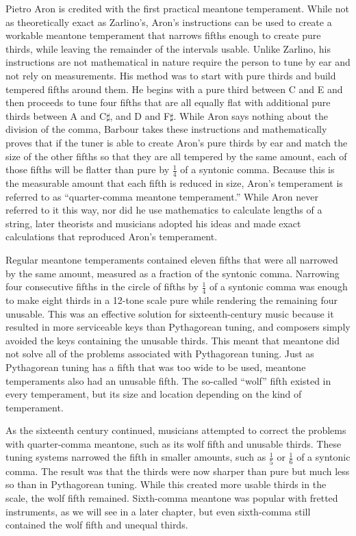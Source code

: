 Pietro Aron is credited with the first practical meantone temperament.  While not as theoretically
exact as Zarlino's, Aron's instructions can be used to create a workable meantone temperament that
narrows fifths enough to create pure thirds, while leaving the remainder of the intervals usable.
Unlike Zarlino, his instructions are not mathematical in nature require the person to tune by ear
and not rely on measurements.  His method was to start with pure thirds and build tempered fifths
around them.  He begins with a pure third between C and E and then proceeds to tune four fifths that
are all equally flat with additional pure thirds between A and C$\sharp$, and D and F$\sharp$.
While Aron says nothing about the division of the comma, Barbour takes these instructions and
mathematically proves that if the tuner is able to create Aron's pure thirds by ear and match the
size of the other fifths so that they are all tempered by the same amount, each of those fifths will
be flatter than pure by $ \frac{1}{4} $ of a syntonic comma.\autocite[27]{MB:1}  Because this is the
measurable amount that each fifth is reduced in size, Aron's temperament is referred to as
``quarter-comma meantone temperament.'' While Aron never referred to it this way, nor did he use
mathematics to calculate lengths of a string, later theorists and musicians adopted his ideas and made
exact calculations that reproduced Aron's temperament.

Regular meantone temperaments contained eleven fifths that were all narrowed by the same
amount, measured as a fraction of the syntonic comma. Narrowing
four consecutive fifths in the circle of fifths by $ \frac{1}{4} $ of a syntonic comma was
enough to make eight thirds in a 12-tone scale pure while rendering the remaining four
unusable.\autocite[33]{RD:1}  This was an effective solution for
sixteenth-century music because it resulted in more serviceable keys than Pythagorean
tuning, and composers simply avoided the keys containing the unusable thirds.
This meant that meantone did not solve all of the problems associated with
Pythagorean tuning.  Just as Pythagorean tuning has a fifth that was too wide to be used,
meantone temperaments also had an unusable fifth.  The so-called ``wolf'' fifth existed in
every temperament, but its size and location depending on the kind of temperament.

As the sixteenth century continued, musicians attempted to correct the problems with
quarter-comma meantone, such as its wolf fifth and unusable thirds.
These tuning systems narrowed the fifth in smaller amounts, such as $
\frac{1}{5} $ or $ \frac{1}{6} $ of a syntonic comma. The result was that the thirds were
now sharper than pure but much less so than in Pythagorean tuning.  While this created
more usable thirds in the scale, the wolf fifth remained.  Sixth-comma meantone was
popular with fretted instruments, as we will see in a later chapter, but even sixth-comma
still contained the wolf fifth and unequal thirds.

